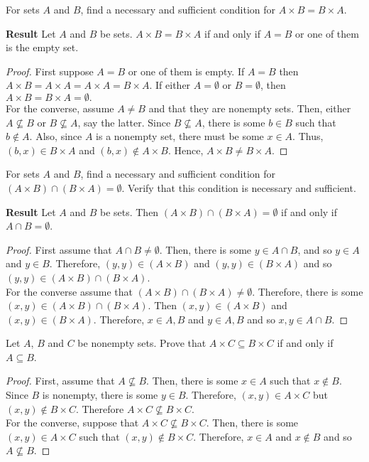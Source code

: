 \documentclass[12pt]{article}
\newenvironment{problem}[2][Problem]{\begin{trivlist}
		\item[\hskip \labelsep {\bfseries #1}\hskip \labelsep {\bfseries #2.}]}{\end{trivlist}}
\newenvironment{solution}[2][Solution]{\begin{trivlist}
		\item[\hskip \labelsep {\bfseries #1}\hskip \labelsep {\bfseries #2.}]}{\end{trivlist}}
\begin{document}
	\begin{problem}{63}
		For sets $A$ and $B$, find a necessary and sufficient condition for $A\times B = B\times A$.
		\begin{solution}{}
			\textbf{Result} Let $A$ and $B$ be sets. $A\times B = B\times A$ if and only if $A=B$ or one of them is the empty set.
			\begin{proof}
				First suppose $A=B$ or one of them is empty. If $A=B$ then $A\times B = A\times A = A\times A = B\times A$. If either $A=\emptyset$ or $B=\emptyset$, then $A\times B = B\times A = \emptyset.$\\
				For the converse, assume $A\neq B$ and that they are nonempty sets. Then, either $A\not\subseteq B$ or $B\not\subseteq A$, say the latter. Since $B\not\subseteq A$, there is some $b\in B$ such that $b\not\in A$. Also, since $A$ is a nonempty set, there must be some $x\in A$. Thus, $(b,x)\in B\times A$ and $(b,x) \not\in A\times B$. Hence, $A\times B \neq B\times A$.
			\end{proof}
		\end{solution}
	\end{problem}

	\begin{problem}{64}
		For sets $A$ and $B$, find a necessary and sufficient condition for $(A\times B)\cap (B\times A)=\emptyset$. Verify that this condition is necessary and sufficient.
		\begin{solution}{}
			\textbf{Result} Let $A$ and $B$ be sets. Then $(A\times B)\cap (B\times A)=\emptyset$ if and only if $A\cap B = \emptyset$. 
			\begin{proof}
				First assume that $A\cap B \neq \emptyset$. Then, there is some $y\in A\cap B$, and so $y\in A$ and $y\in B$. Therefore, $(y,y)\in (A\times B)$ and $(y,y)\in (B\times A)$ and so $(y,y)\in (A\times B)\cap (B\times A)$.\\
				For the converse assume that $(A\times B)\cap (B\times A)\neq \emptyset$. Therefore, there is some $(x,y) \in (A\times B)\cap (B\times A)$. Then $(x,y)\in (A\times B)$ and $(x,y) \in (B\times A)$. Therefore, $x\in A,B$ and $y\in A,B$ and so $x,y\in A\cap B$.
			\end{proof}
		\end{solution}
	\end{problem}

	\begin{problem}{65}
		Let $A$, $B$ and $C$ be nonempty sets. Prove that $A\times C \subseteq B \times C$ if and only if $A\subseteq B$.
		\begin{proof}
			First, assume that $A\not\subseteq B$. Then, there is some $x\in A$ such that $x\not\in B$. Since $B$ is nonempty, there is some $y \in B$. Therefore, $(x,y) \in A\times C$ but $(x,y) \not\in B\times C$. Therefore $A\times C \not\subseteq B \times C$.\\
			For the converse, suppose that $A\times C \not\subseteq B \times C$. Then, there is some $(x,y)\in A\times C$ such that $(x,y) \not\in B \times C$. Therefore, $x\in A$ and $x\not\in B$ and so $A\not\subseteq B$.
		\end{proof}
	\end{problem}
\end{document}
